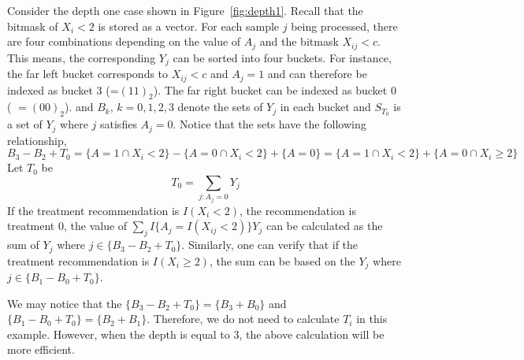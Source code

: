Consider the depth one case shown in Figure~\ref{fig:depth1}. Recall that the
bitmask of $X_i < 2$ is stored as a vector. For each sample $j$ being processed, there are
four combinations depending on the value of $A_j$ and the bitmask $X_{ij} < c$. This
means, the corresponding $Y_j$ can be sorted into four buckets. For instance,
the far left bucket corresponds to $X_{ij} < c$ and $A_j=1$ and can therefore be
indexed as bucket 3 (=$(11)_2$). The far right bucket can be indexed as bucket 0 (
$=(00)_2$). 
and $B_k$, $k=0,1,2,3$ denote the sets of $Y_j$  in each bucket and $S_{T_0}$ is a set of $Y_j$ where $j$ satisfies $A_j=0$.
Notice that the sets have the following relationship,
\[B_3 - B_2 + T_0 
=  \{A = 1 \cap X_i < 2\} - \{A = 0 \cap X_i < 2\} + \{A = 0\}
= \{A = 1 \cap X _i< 2\} + \{A = 0 \cap X_i \geq 2\}
\]
%
Let $T_0$ be
\[
T_0 = \sum_{j:A_j = 0} Y_j
\]
If the treatment recommendation is $I(X_i < 2)$, the recommendation is treatment 0, the value of $\sum_j I\{A_j=I(X_{ij}<2)\}Y_j$ can be calculated as the sum of $Y_j$ where $j \in \{B_3 - B_2 + T_0\}$.
Similarly, one can verify that if the treatment recommendation is $I(X_i \geq 2)$, the sum can be based on the $Y_j$ where $j \in \{B_1 - B_0 + T_0\}$. 

We may notice that the $\{B_3 - B_2 + T_0\}=\{B_3+B_0\}$ and $\{B_1 - B_0 + T_0\}=\{B_2+B_1\}$. Therefore, we do not need to calculate $T_i$ in this example. However, when the depth is equal to 3, the above calculation will be more efficient. 
